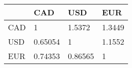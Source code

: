 \begin{tabular}{llll}
& CAD & USD & EUR \\ 
\hline 
CAD & 1 & 1.5372 & 1.3449 \\ 
USD & 0.65054 & 1 & 1.1552 \\ 
EUR & 0.74353 & 0.86565 & 1 \\ 
\hline 
\end{tabular}